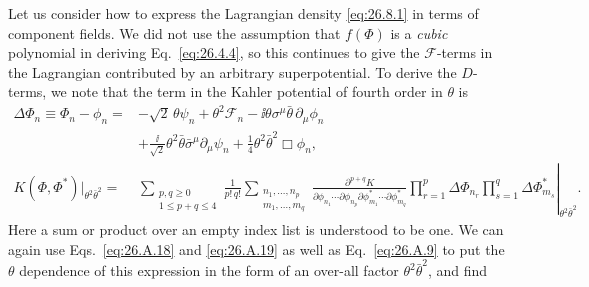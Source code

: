 Let us consider how to express the Lagrangian density \eqref{eq:26.8.1} in
terms of component fields. We did not use the assumption that \(f(\Phi)\) is
a \textit{cubic} polynomial in deriving Eq.~\eqref{eq:26.4.4}, so this
continues to give the \(\mathcal{F}\)-terms in the Lagrangian contributed by
an arbitrary superpotential. To derive the \(D\)-terms, we note that the term
in the Kahler potential of fourth order in \(\theta\) is
\begin{equation}
  \begin{aligned}
  \Delta\Phi_n\equiv\Phi_n-\phi_n
  ={}&-\sqrt2\,\theta\psi_n+\theta^2\mathcal F_n
     -\ii\theta\sigma^\mu\bar\theta\,\partial_\mu\phi_n\\
    &+\frac{\ii}{\sqrt2}\theta^2\bar\theta
       \bar\sigma^\mu\partial_\mu\psi_n
     +\frac14\theta^2\bar\theta^2\Box\phi_n ,
  \\
  K(\Phi,\Phi^*)\big|_{\theta^2\bar\theta^2}
  ={}&
  \left.
  \sum_{\substack{p,q\geq0\\1\leq p+q\leq4}}
  \frac{1}{p!\,q!}
  \sum_{\substack{n_1,\ldots,n_p\\m_1,\ldots,m_q}}
  \frac{\partial^{p+q}K}
       {\partial\phi_{n_1}\cdots\partial\phi_{n_p}
        \partial\phi_{m_1}^*\cdots\partial\phi_{m_q}^*}
  \prod_{r=1}^{p}\Delta\Phi_{n_r}
  \prod_{s=1}^{q}\Delta\Phi_{m_s}^*
  \right|_{\theta^2\bar\theta^2}.
  \end{aligned}
  \tag{26.8.2}\label{eq:26.8.2}
\end{equation}
Here a sum or product over an empty index list is understood to be one.
We can again use Eqs.~\eqref{eq:26.A.18} and \eqref{eq:26.A.19} as well as
Eq.~\eqref{eq:26.A.9} to put the \(\theta\) dependence of this expression in
the form of an over-all factor \(\theta^2\bar\theta^2\), and find
